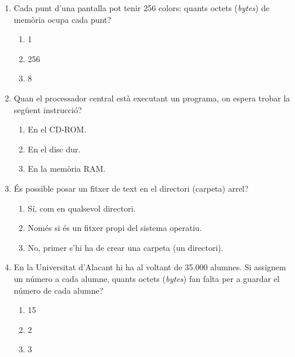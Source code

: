 \begin{enumerate}
\item Cada punt d'una pantalla pot tenir 256 colors: quants octets
  (\emph{bytes}) de memòria ocupa cada punt?
  \begin{enumerate}
  \item 1
  \item 256
  \item 8
  \end{enumerate}


\item Quan el processador central està executant un programa, on
  espera trobar la següent instrucció?
  \begin{enumerate}
  \item En el CD-ROM.
  \item En el disc dur.
  \item En la memòria RAM.
  \end{enumerate}

\item És possible posar un fitxer de text en el directori (carpeta)
  arrel?
  \begin{enumerate}
  \item Sí, com en qualsevol directori.
  \item Només si és un fitxer propi del sistema operatiu.
  \item No, primer s'hi ha de crear una carpeta (un directori).
  \end{enumerate}

\item En la Universitat d'Alacant hi ha al voltant de 35.000
  alumnes. Si assignem un número a cada alumne, quants octets
  (\emph{bytes}) fan falta per a guardar el número de cada alumne?
  \begin{enumerate}
  \item 15
  \item 2
  \item 3
  \end{enumerate}


\end{enumerate}
